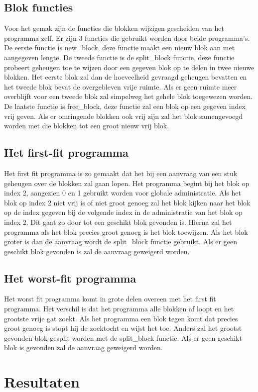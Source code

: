 \documentclass[11pt]{article}
\begin{document}
		\subsection{Blok functies}\label{sec:programmafunc}
			Voor het gemak zijn de functies die blokken wijzigen gescheiden van het programma zelf. Er zijn 3 functies die gebruikt worden door beide programma's.
			De eerste functie is new\_block, deze functie maakt een nieuw blok aan met aangegeven lengte. De tweede functie is de split\_block functie, deze functie
			probeert geheugen toe te wijzen door een gegeven blok op te delen in twee nieuwe blokken. Het eerste blok zal dan de hoeveelheid gevraagd geheugen bevatten
			en het tweede blok bevat de overgebleven vrije ruimte. Als er geen ruimte meer overblijft voor een tweede blok zal simpelweg het gehele blok toegewezen worden.
			De laatste functie is free\_block, deze functie zal een blok op een gegeven index vrij geven.
			Als er omringende blokken ook vrij zijn zal het blok samengevoegd worden met die blokken tot een groot nieuw vrij blok.
			
		\subsection{Het first-fit programma}\label{sec:programmaff}
			Het first fit programma is zo gemaakt dat het bij een aanvraag van een stuk geheugen over de blokken zal gaan lopen.
			Het programma begint bij het blok op index 2, aangezien 0 en 1 gebruikt worden voor globale administratie.
			Als het blok op index 2 niet vrij is of niet groot genoeg zal het blok kijken naar het blok op de index gegeven bij de volgende index in
			de administratie van het blok op index 2. Dit gaat zo door tot een geschikt blok gevonden is.
			Hierna zal het programma als het blok precies groot genoeg is het blok toewijzen.
			Als het blok groter is dan de aanvraag wordt de split\_block functie gebruikt.
			Als er geen geschikt blok gevonden is zal de aanvraag geweigerd worden.
			
		\subsection{Het worst-fit programma}\label{sec:programmawf}
			Het worst fit programma komt in grote delen overeen met het first fit programma.
			Het verschil is dat het programma alle blokken af loopt en het grootste vrije gat zoekt.
			Als het programma een blok tegen komt dat precies groot genoeg is stopt hij de zoektocht en wijst het toe.
			Anders zal het grootst gevonden blok gesplit worden met de split\_block functie.
			Als er geen geschikt blok is gevonden zal de aanvraag geweigerd worden.
	\section{Resultaten}\label{sec:resultaten}
\end{document}
